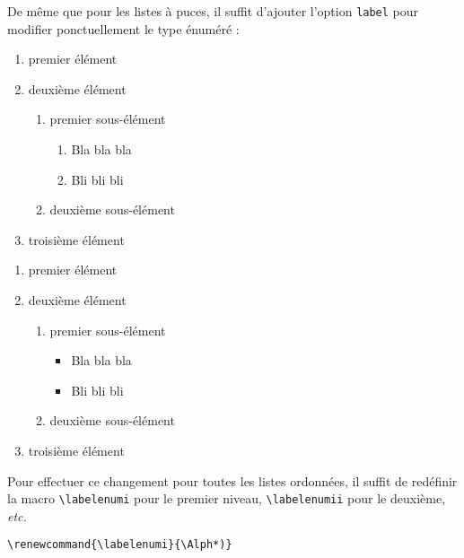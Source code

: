 \documentclass{rapport}
\def\etc{\textit{etc.}\xspace}
\begin{document}
        De même que pour les listes à puces, il suffit d'ajouter l'option \verb|label| pour modifier ponctuellement le type énuméré :
        
        \begin{enumerate}[label=\Roman* \ding{228}]
          \item premier élément
          \item deuxième élément
          \begin{enumerate}[label=\arabic*~:]
            \item premier sous-élément
            \begin{enumerate}[label=\alph*.]
              \item Bla bla bla
              \item Bli bli bli
            \end{enumerate}
            \item deuxième sous-élément
          \end{enumerate}
          \item troisième élément
        \end{enumerate}
        
        \begin{enumerate}[label=\textcolor{magenta}{\Alph*)}]
          \item premier élément
          \item deuxième élément
          \begin{enumerate}[label=(\textcolor{bleu}{\roman*})]
            \item premier sous-élément
            \begin{itemize}
              \item Bla bla bla
              \item Bli bli bli
            \end{itemize}
            \item deuxième sous-élément
          \end{enumerate}
          \item troisième élément
        \end{enumerate}
        
        Pour effectuer ce changement pour toutes les listes ordonnées, il suffit de redéfinir la macro \verb|\labelenumi| pour le premier niveau, \verb|\labelenumii| pour le deuxième, \etc
        
        \begin{verbatim}
\renewcommand{\labelenumi}{\Alph*)}\end{verbatim}
        
\end{document}
